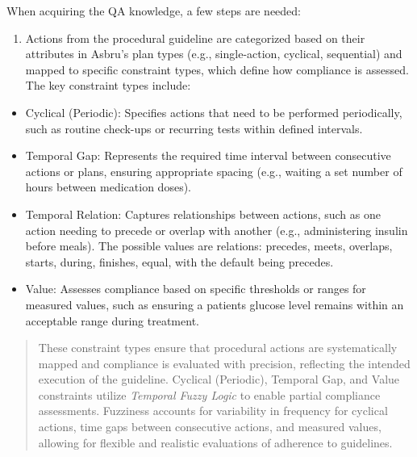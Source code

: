 \documentclass[
]{article}
\begin{document}
When acquiring the QA knowledge, a few steps are needed:

\begin{enumerate}
\def\labelenumi{\arabic{enumi}.}
\item
  Actions from the procedural guideline are categorized based on their
  attributes in Asbru's plan types (e.g., single-action, cyclical,
  sequential) and mapped to specific constraint types, which define how
  compliance is assessed. The key constraint types include:
\end{enumerate}

\begin{itemize}
\item
  Cyclical (Periodic): Specifies actions that need to be performed
  periodically, such as routine check-ups or recurring tests within
  defined intervals.
\item
  Temporal Gap: Represents the required time interval between
  consecutive actions or plans, ensuring appropriate spacing (e.g.,
  waiting a set number of hours between medication doses).
\item
  Temporal Relation: Captures relationships between actions, such as one
  action needing to precede or overlap with another (e.g., administering
  insulin before meals). The possible values are relations: precedes,
  meets, overlaps, starts, during, finishes, equal, with the default
  being precedes.
\item
  Value: Assesses compliance based on specific thresholds or ranges for
  measured values, such as ensuring a patient\textquotesingle s glucose
  level remains within an acceptable range during treatment.
\end{itemize}

\begin{quote}
These constraint types ensure that procedural actions are systematically
mapped and compliance is evaluated with precision, reflecting the
intended execution of the guideline. Cyclical (Periodic), Temporal Gap,
and Value constraints utilize \emph{Temporal Fuzzy Logic} to enable
partial compliance assessments. Fuzziness accounts for variability in
frequency for cyclical actions, time gaps between consecutive actions,
and measured values, allowing for flexible and realistic evaluations of
adherence to guidelines.
\end{quote}
\end{document}
